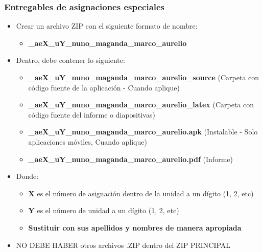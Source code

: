 \begin{frame}
\frametitle{Entregables de asignaciones especiales}
    \begin{itemize}
    \item Crear un archivo ZIP con el siguiente formato de nombre:
    \begin{itemize}
        \item \textbf{\clavegrupo\_aeX\_uY\_nuno\_maganda\_marco\_aurelio}
    \end{itemize}
    \item Dentro, debe contener lo siguiente:
        \begin{itemize}
        \item \textbf{\clavegrupo\_aeX\_uY\_nuno\_maganda\_marco\_aurelio\_source} (Carpeta con c\'odigo fuente de la aplicaci\'on - Cuando aplique)
        \item \textbf{\clavegrupo\_aeX\_uY\_nuno\_maganda\_marco\_aurelio\_latex} (Carpeta con c\'odigo fuente del informe o diapositivas)
        \item \textbf{\clavegrupo\_aeX\_uY\_nuno\_maganda\_marco\_aurelio.apk} (Instalable - Solo aplicaciones móviles, Cuando aplique)
        \item \textbf{\clavegrupo\_aeX\_uY\_nuno\_maganda\_marco\_aurelio.pdf} (Informe)
        \end{itemize}
    \item Donde:
        \begin{itemize}
        \item \textbf{X} es el n\'umero de asignación dentro de la unidad a un d\'igito (1, 2, etc)
        \item \textbf{Y} es el n\'umero de unidad a un d\'igito (1, 2, etc)
        \item \textbf{Sustituir con sus apellidos y nombres de manera apropiada} 
        \end{itemize}
	\item NO DEBE HABER otros archivos .ZIP dentro del ZIP PRINCIPAL
    \end{itemize}
\end{frame}





